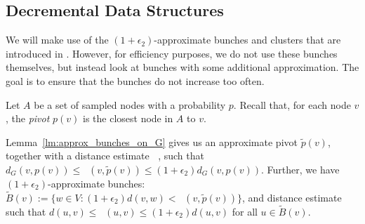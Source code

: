 \documentclass[11pt]{article}
\theoremstyle{definition}
\theoremstyle{remark}
\newcommand{\ttodo}[1]{\todo[color=orange!20]{T: #1}}
\DeclareMathOperator{\dLNbunch}{\delta_{\tilde{B}}}
\begin{document}
\begin{titlepage}
    
\subsection{Decremental Data Structures}\label{sc:mult_alg}

We will make use of the $(1+\epsilon_2)$-approximate bunches and clusters that are introduced in . However, for efficiency purposes, we do not use these bunches themselves, but instead look at bunches with some additional approximation. The goal is to ensure that the bunches do not increase too often. 

Let $A$ be a set of sampled nodes with a probability $p$. Recall that, for each node $v$, the \emph{pivot} $p(v)$ is the closest node in $A$ to $v$.

Lemma~\ref{lm:approx_bunches_on_G} gives us an approximate pivot $\tilde p(v)$, together with a distance estimate $\dLNbunch$, such that $d_G(v,p(v)) \leq \dLNbunch(v,\tilde{p}(v)) \leq (1+\epsilon_2) d_G(v,p(v))$. Further, we have $(1+\epsilon_2)$-approximate bunches: $\tilde B(v) := \{w\in V : (1+\epsilon_2)d(v,w) < \dLNbunch(v,\tilde p(v))\}$, and distance estimate $\dLNbunch$ such that $d(u,v)\leq \dLNbunch(u,v)\leq (1+\epsilon_2)d(u,v)$ for all $u\in \tilde B(v)$.



\end{titlepage}
\end{document}

